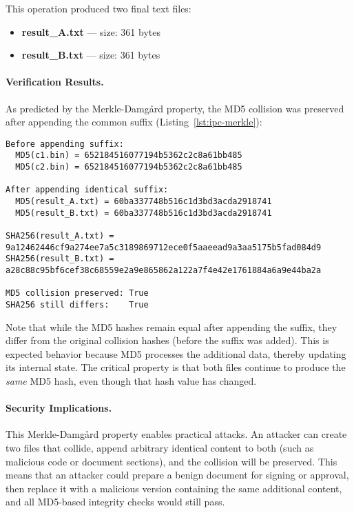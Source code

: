 \documentclass[runningheads]{llncs}
\begin{document}
    This operation produced two final text files:
    \begin{itemize}
        \item \textbf{result\_A.txt} — size: 361 bytes
        \item \textbf{result\_B.txt} — size: 361 bytes
    \end{itemize}

    \paragraph{Verification Results.}
    As predicted by the Merkle-Damgård property, the MD5 collision was preserved after appending the common suffix (Listing~\ref{lst:ipc-merkle}):

    \begin{lstlisting}[style=hashblock,caption={Merkle-Damgård property verification},label={lst:ipc-merkle}]
Before appending suffix:
  MD5(c1.bin) = 652184516077194b5362c2c8a61bb485
  MD5(c2.bin) = 652184516077194b5362c2c8a61bb485

After appending identical suffix:
  MD5(result_A.txt) = 60ba337748b516c1d3bd3acda2918741
  MD5(result_B.txt) = 60ba337748b516c1d3bd3acda2918741

SHA256(result_A.txt) = 9a12462446cf9a274ee7a5c3189869712ece0f5aaeead9a3aa5175b5fad084d9
SHA256(result_B.txt) = a28c88c95bf6cef38c68559e2a9e865862a122a7f4e42e1761884a6a9e44ba2a

MD5 collision preserved: True
SHA256 still differs:    True
    \end{lstlisting}

    Note that while the MD5 hashes remain equal after appending the suffix, they differ from the original collision hashes (before the suffix was added). This is expected behavior because MD5 processes the additional data, thereby updating its internal state. The critical property is that both files continue to produce the \emph{same} MD5 hash, even though that hash value has changed.

    \paragraph{Security Implications.}
    This Merkle-Damgård property enables practical attacks. An attacker can create two files that collide, append arbitrary identical content to both (such as malicious code or document sections), and the collision will be preserved. This means that an attacker could prepare a benign document for signing or approval, then replace it with a malicious version containing the same additional content, and all MD5-based integrity checks would still pass.
\end{document}
